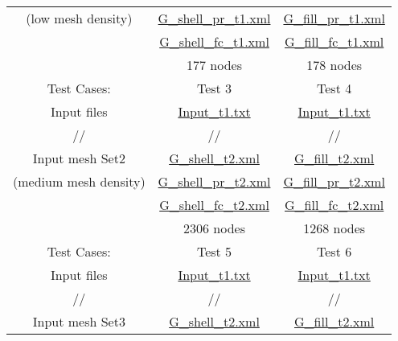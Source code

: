 \documentclass[12pt, titlepage]{article}
\begin{document}
\begin{enumerate}
\begin{table}
\begin{tabular}{|c|c|c|}
			(low mesh density)&			 \href{https://github.com/shmouses/SPDFM/tree/master/src/Mesh}{G\_shell\_pr\_t1.xml} & \href{https://github.com/shmouses/SPDFM/tree/master/src/Mesh}{G\_fill\_pr\_t1.xml} \\
			 &\href{https://github.com/shmouses/SPDFM/tree/master/src/Mesh}{G\_shell\_fc\_t1.xml} & \href{https://github.com/shmouses/SPDFM/tree/master/src/Mesh}{G\_fill\_fc\_t1.xml} \\
			 & 177 nodes & 178 nodes\\
			\hline
			
			
						Test Cases: & Test 3 & Test 4  \\
			\hline 
			Input files & \href{https://github.com/shmouses/SPDFM/tree/master/src/Input/Input_t1.txt}{Input\_t1.txt} & \href{https://github.com/shmouses/SPDFM/tree/master/src/Input/Input_t1.txt}{Input\_t1.txt} \\
			 // & // & // \\
			
			\hline 
			Input mesh Set2 & \href{https://github.com/shmouses/SPDFM/tree/master/src/Mesh/G_shell_t2.xml}{G\_shell\_t2.xml} & \href{https://github.com/shmouses/SPDFM/tree/master/src/Mesh/G_fill_t2.xml}{G\_fill\_t2.xml} \\
			
			(medium mesh density)&			 \href{https://github.com/shmouses/SPDFM/tree/master/src/Mesh/G_shell_pr_t2.xml}{G\_shell\_pr\_t2.xml} & \href{https://github.com/shmouses/SPDFM/tree/master/src/Mesh/G_fill_pr_t2.xml}{G\_fill\_pr\_t2.xml} \\
			&\href{https://github.com/shmouses/SPDFM/tree/master/src/Mesh/G_shell_fc_t2.xml}{G\_shell\_fc\_t2.xml} & \href{https://github.com/shmouses/SPDFM/tree/master/src/Mesh/G_fill_fc_t2.xml}{G\_fill\_fc\_t2.xml} \\
			& 2306 nodes & 1268 nodes\\
			\hline
			
						Test Cases: & Test 5 & Test 6  \\
			\hline 
			Input files & \href{https://github.com/shmouses/SPDFM/tree/master/src/Input/Input_t1.txt}{Input\_t1.txt} & \href{https://github.com/shmouses/SPDFM/tree/master/src/Input/Input_t1.txt}{Input\_t1.txt} \\
			 // & // & // \\
			\hline 
			Input mesh Set3 & \href{https://github.com/shmouses/SPDFM/tree/master/src/Mesh/G_shell_t3.xml}{G\_shell\_t2.xml} & \href{https://github.com/shmouses/SPDFM/tree/master/src/Mesh/G_fill_t3.xml}{G\_fill\_t2.xml} \\
			

\end{tabular}
\end{table}
\end{enumerate}
\end{document}
